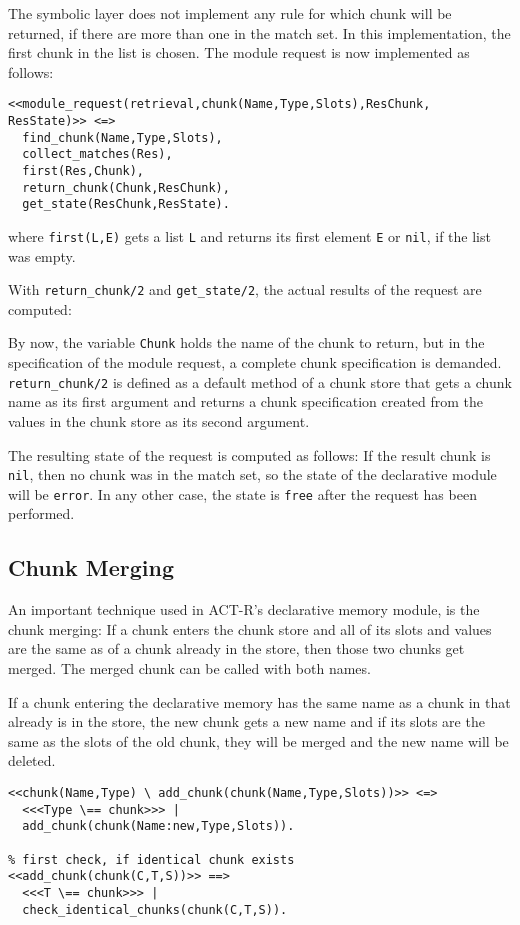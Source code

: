 The symbolic layer does not implement any rule for which chunk will be returned, if there are more than one in the match set. In this implementation, the first chunk in the list is chosen. The module request is now implemented as follows:

\begin{lstlisting}
<<module_request(retrieval,chunk(Name,Type,Slots),ResChunk, ResState)>> <=> 
  find_chunk(Name,Type,Slots),
  collect_matches(Res),
  first(Res,Chunk),
  return_chunk(Chunk,ResChunk),
  get_state(ResChunk,ResState).
\end{lstlisting}

where \lstinline|first(L,E)| gets a list \lstinline|L| and returns its first element \lstinline|E| or \lstinline|nil|, if the list was empty.

With \lstinline|return_chunk/2| and \lstinline|get_state/2|, the actual results of the request are computed:

By now, the variable \lstinline|Chunk| holds the name of the chunk to return, but in the specification of the module request, a complete chunk specification is demanded. \lstinline|return_chunk/2| is defined as a default method of a chunk store that gets a chunk name as its first argument and returns a chunk specification created from the values in the chunk store as its second argument.

The resulting state of the request is computed as follows: If the result chunk is \lstinline|nil|, then no chunk was in the match set, so the state of the declarative module will be \lstinline|error|. In any other case, the state is \lstinline|free| after the request has been performed.

\subsection{Chunk Merging}

An important technique used in ACT-R's declarative memory module, is the chunk merging: If a chunk enters the chunk store and all of its slots and values are the same as of a chunk already in the store, then those two chunks get merged. The merged chunk can be called with both names.

If a chunk entering the declarative memory has the same name as a chunk in that already is in the store, the new chunk gets a new name and if its slots are the same as the slots of the old chunk, they will be merged and the new name will be deleted.

\begin{lstlisting}
<<chunk(Name,Type) \ add_chunk(chunk(Name,Type,Slots))>> <=>
  <<<Type \== chunk>>> |
  add_chunk(chunk(Name:new,Type,Slots)).

% first check, if identical chunk exists
<<add_chunk(chunk(C,T,S))>> ==> 
  <<<T \== chunk>>> | 
  check_identical_chunks(chunk(C,T,S)).
\end{lstlisting}

